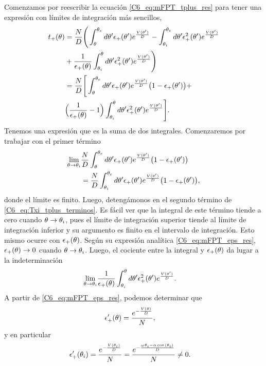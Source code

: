 \documentclass[./main.tex]{subfiles}
\begin{document}
Comenzamos por reescribir la ecuación \ref{C6_eq:mFPT_tplus_res} para tener una expresión con límites de integración más sencillos,
\begin{align}
     t_{+}(\theta)&= \frac{N}{D} \Bigg(  \int_\theta^{\theta_e} d \theta' \epsilon_{+}(\theta') e^{ \frac{V(\theta')}{D}} -  \int_{\theta_i}^{\theta_e} d\theta'  \epsilon_{+}^2(\theta') e^{ \frac{V(\theta')}{D}} \nonumber \\ & + \frac{1}{\epsilon_{+}(\theta)} \int_{\theta_i}^{\theta} d\theta'  \epsilon_{+}^2(\theta') e^{ \frac{V(\theta')}{D}} \Bigg) \nonumber \\
     &= \frac{N}{D} \Bigg[  \int_\theta^{\theta_e} d \theta' \epsilon_{+}(\theta') e^{ \frac{V(\theta')}{D}} \big(1 - \epsilon_{+}(\theta') \big)+ \nonumber \\ & \Big( \frac{1}{\epsilon_{+}(\theta)} -1 \Big) \int_{\theta_i}^{\theta} d\theta'  \epsilon_{+}^2(\theta') e^{ \frac{V(\theta')}{D}} \Bigg]. \label{C6_eq:Txi_tplus_terminos}
\end{align}
Tenemos una expresión que es la suma de dos integrales. Comenzaremos por trabajar con el primer término 
\begin{align}
     \lim_{\theta \rightarrow   \theta_i }&\frac{N}{D}  \int_\theta^{\theta_e} d \theta' \epsilon_{+}(\theta') e^{ \frac{V(\theta')}{D}} \big(1 - \epsilon_{+}(\theta') \big) \nonumber \\
     &= \frac{N}{D} \int_{\theta_i}^{\theta_e} d \theta' \epsilon_{+}(\theta') e^{ \frac{V(\theta')}{D}} \big(1 - \epsilon_{+}(\theta') \big),
     \label{C6_eq:Txi_LI1}
\end{align}
donde el límite es finito. Luego, detengámonos en el segundo término de \ref{C6_eq:Txi_tplus_terminos}. Es fácil ver que la integral de este término tiende a cero cuando $\theta \rightarrow \theta_i $, pues el límite de integración superior tiende al límite de integración inferior y su argumento es finito en el intervalo de integración. Esto mismo ocurre con $\epsilon_{+}(\theta)$. Según su expresión analítica \ref{C6_eq:mFPT_eps_res}, $\epsilon_{+}(\theta) \rightarrow 0$ cuando $\theta \rightarrow \theta_i $. Luego, el cociente entre la integral y $\epsilon_{+}(\theta)$ da lugar a la indeterminación 
\begin{align}
      \lim_{\theta \rightarrow   \theta_i }& \frac{1}{\epsilon_{+}(\theta)}  \int_{\theta_i}^{\theta} d\theta'  \epsilon_{+}^2(\theta') e^{ \frac{V(\theta')}{D}}.
     \label{C6_eq:Txi_LI2_S1}
\end{align}
A partir de \ref{C6_eq:mFPT_eps_res}, podemos determinar que 
\begin{align}
     \epsilon_{+}'(\theta) & = \frac{e^{- \frac{V(\theta)}{D}}}{N},
\end{align}
y en particular 
\begin{align}
     \epsilon_{+}'(\theta_i) & = \frac{e^{- \frac{V(\theta_i)}{D}}}{N} = \frac{e^{- \frac{\omega \theta_i - \alpha \cos{(\ensuremath{\theta_i})}}{D}}}{N} \neq 0. \nonumber 
\end{align}
\end{document}
